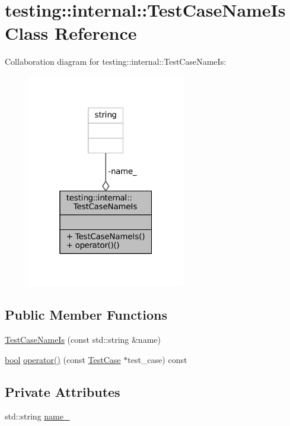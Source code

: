 \hypertarget{classtesting_1_1internal_1_1TestCaseNameIs}{}\section{testing\+:\+:internal\+:\+:Test\+Case\+Name\+Is Class Reference}
\label{classtesting_1_1internal_1_1TestCaseNameIs}


Collaboration diagram for testing\+:\+:internal\+:\+:Test\+Case\+Name\+Is\+:
\nopagebreak
\begin{figure}[H]
\begin{center}
\leavevmode
\includegraphics[width=196pt]{classtesting_1_1internal_1_1TestCaseNameIs__coll__graph}
\end{center}
\end{figure}
\subsection*{Public Member Functions}
\begin{DoxyCompactItemize}
\item 
\hyperlink{classtesting_1_1internal_1_1TestCaseNameIs_a7c983707f4cfe7f36dbabc95da5113c4}{Test\+Case\+Name\+Is} (const std\+::string \&name)
\item 
\hyperlink{classbool}{bool} \hyperlink{classtesting_1_1internal_1_1TestCaseNameIs_aa96c4e9facbaa7043c8f0b34465d1eae}{operator()} (const \hyperlink{classtesting_1_1TestCase}{Test\+Case} $\ast$test\+\_\+case) const
\end{DoxyCompactItemize}
\subsection*{Private Attributes}
\begin{DoxyCompactItemize}
\item 
std\+::string \hyperlink{classtesting_1_1internal_1_1TestCaseNameIs_a4e780c6613a81c4f14fc57e00c61474b}{name\+\_\+}
\end{DoxyCompactItemize}


